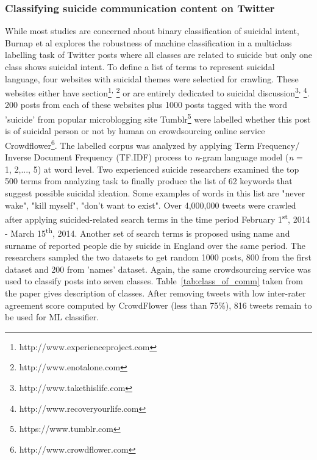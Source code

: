 \subsubsection*{Classifying suicide communication content on Twitter}
While most studies are concerned about binary classification of suicidal intent, Burnap et al \cite{Burnap2015} explores the robustness of machine classification in a multiclass labelling task of Twitter posts where all classes are related to suicide but only one class shows suicidal intent. To define a list of terms to represent suicidal language, four websites with suicidal themes were selectied for crawling. These websites either have section\footnote{http://www.experienceproject.com}\textsuperscript{, }\footnote{http://www.enotalone.com} or are entirely dedicated to suicidal discussion\footnote{http://www.takethislife.com}\textsuperscript{, }\footnote{http://www.recoveryourlife.com}. 200 posts from each of these websites plus 1000 posts tagged with the word 'suicide' from popular microblogging site Tumblr\footnote{https://www.tumblr.com} were labelled whether this post is of suicidal person or not by human on crowdsourcing online service Crowdflower\footnote{http://www.crowdflower.com}. The labelled corpus was analyzed by applying Term Frequency/ Inverse Document Frequency (TF.IDF) process to \textit{n}-gram language model (\textit{n} = 1, 2,..., 5) at word level. Two experienced suicide researchers examined the top 500 terms from analyzing task to finally produce the list of 62 keywords that suggest possible suicidal ideation. Some examples of words in this list are "never wake", "kill myself", "don't want to exist". Over 4,000,000 tweets were crawled after applying suicided-related search terms in the time period  February 1\textsuperscript{st}, 2014 - March 15\textsuperscript{th}, 2014. Another set of search terms is proposed using name and surname of reported people die by suicide in England over the same period. The researchers sampled the two datasets to get random 1000 posts, 800 from the first dataset and 200 from 'names' dataset. Again, the same crowdsourcing service was used to classify posts into seven classes. Table~\ref{tab:class_of_comm} taken from the paper \cite{Burnap2015} gives description of classes. After removing tweets with low inter-rater agreement score computed by CrowdFlower (less than 75\%), 816 tweets remain to be used for ML classifier.
